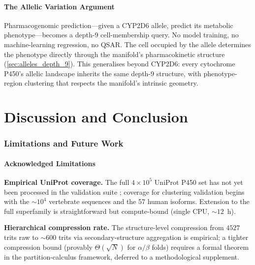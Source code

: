\documentclass[11pt,twocolumn,a4paper]{article}
\theoremstyle{definition}
\theoremstyle{remark}
\begin{document}
\subsection{The Allelic Variation Argument}

Pharmacogenomic prediction---given a CYP2D6 allele, predict its metabolic phenotype---becomes a depth-9 cell-membership query. No model training, no machine-learning regression, no QSAR. The cell occupied by the allele determines the phenotype directly through the manifold's pharmacokinetic structure (\cref{sec:alleles_depth_9}). This generalises beyond CYP2D6: every cytochrome P450's allelic landscape inherits the same depth-9 structure, with phenotype-region clustering that respects the manifold's intrinsic geometry.

\part{Discussion and Conclusion}

\section{Limitations and Future Work}
\label{sec:limits}

\subsection{Acknowledged Limitations}

\textbf{Empirical UniProt coverage.} The full $4 \times 10^5$ UniProt P450 set has not yet been processed in the validation suite \citep{paper2_validation}; coverage for clustering validation begins with the $\sim 10^4$ vertebrate sequences and the 57 human isoforms. Extension to the full superfamily is straightforward but compute-bound (single CPU, $\sim 12$~h).

\textbf{Hierarchical compression rate.} The structure-level compression from $4527$ trits raw to $\sim 600$ trits via secondary-structure aggregation is empirical; a tighter compression bound (provably $\Theta(\sqrt{N})$ for $\alpha/\beta$ folds) requires a formal theorem in the partition-calculus framework, deferred to a methodological supplement.
\end{document}
